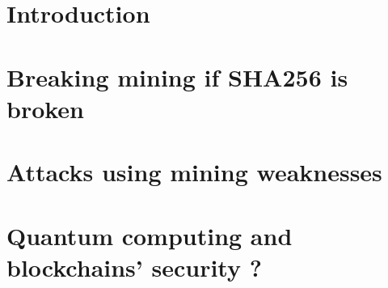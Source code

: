 \documentclass[a4paper,twoside,10pt]{report}
\begin{document}

\thispagestyle{empty}

\tableofcontents %
\thispagestyle{empty}
\clearpage



\chapter{Introduction}
\setcounter{page}{1}

  

  

  


%  

%  

\chapter{Breaking mining if SHA256 is broken}

	

  

  

  

  

\chapter{Attacks using mining weaknesses}

  

  

\chapter{Quantum computing and blockchains' security ?}

  

  

\appendix



\nocite{*}


\end{document}
